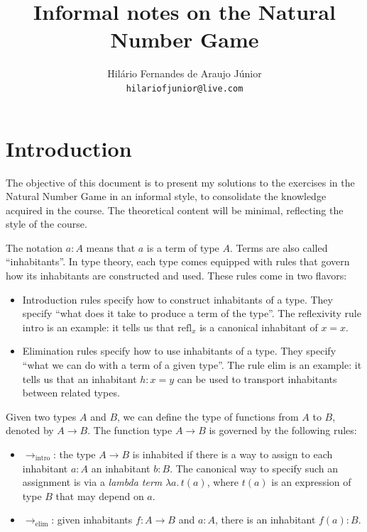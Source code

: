 \documentclass[12pt]{article}
\title{\bf Informal notes on the Natural Number Game}
\author{Hil\'{a}rio Fernandes de Araujo J\'{u}nior \\ \texttt{hilariofjunior@live.com}}
\theoremstyle{definition}
\theoremstyle{remark}
\newcommand{\doublequotes}[1]{``#1''}
\begin{document}
\maketitle
\tableofcontents

\section*{Introduction}

The objective of this document is to present my solutions to the exercises in the Natural Number Game in an informal style, to consolidate the knowledge acquired in the course. The theoretical content will be minimal, reflecting the style of the course.

The notation $a: A$ means that $a$ is a term of type $A$. Terms are also called \doublequotes{inhabitants}. In type theory, each type comes equipped with rules that govern how its inhabitants are constructed and used. These rules come in two flavors:
\begin{itemize}
  \item Introduction rules specify how to construct inhabitants of a type. They specify \doublequotes{what does it take to produce a term of the type}. The reflexivity rule $\text{intro}$ is an example: it tells us that $\text{refl}_x$ is a canonical inhabitant of $x=x$.
  \item Elimination rules specify how to use inhabitants of a type. They specify \doublequotes{what we can do with a term of a given type}. The rule $\text{elim}$ is an example: it tells us that an inhabitant $h:x=y$ can be used to transport inhabitants between related types.
\end{itemize}


Given two types $A$ and $B$, we can define the type of functions from $A$ to $B$, denoted by $A \to B$. The function type $A \to B$ is governed by the following rules:
\begin{itemize}
  \item $\to_{\text{intro}}$: the type $A \to B$ is inhabited if there is a way to assign to each inhabitant $a:A$ an inhabitant $b:B$. The canonical way to specify such an assignment is via a \textit{lambda term} $\lambda a . \, t(a)$, where $t(a)$ is an expression of type $B$ that may depend on $a$.
  \item $\to_{\text{elim}}$: given inhabitants $f:A \to B$ and $a:A$, there is an inhabitant $f(a):B$.
\end{itemize}
\end{document}
